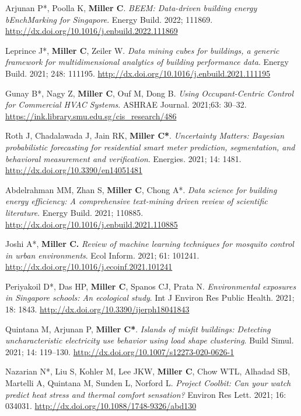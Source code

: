 \documentclass[10pt,a4paper]{article}
\begin{document}
\begin{small}
\begin{etaremune}
\item
Arjunan P*, Poolla K, \textbf{Miller C}. \emph{BEEM: Data-driven building energy bEnchMarking for Singapore}. Energy Build. 2022; 111869. \url{http://dx.doi.org/10.1016/j.enbuild.2022.111869}
\item
Leprince J*, \textbf{Miller C}, Zeiler W. \emph{Data mining cubes for buildings, a generic framework for multidimensional analytics of building performance data}. Energy Build. 2021; 248: 111195. \url{http://dx.doi.org/10.1016/j.enbuild.2021.111195}
\item
Gunay B*, Nagy Z, \textbf{Miller C}, Ouf M, Dong B. \emph{Using Occupant-Centric Control for Commercial HVAC Systems}. ASHRAE Journal. 2021;63: 30–32. \url{https://ink.library.smu.edu.sg/cis_research/486}
\item
Roth J, Chadalawada J, Jain RK, \textbf{Miller C*}. \emph{Uncertainty Matters: Bayesian probabilistic forecasting for residential smart meter prediction, segmentation, and behavioral measurement and verification}. Energies. 2021; 14: 1481. \url{http://dx.doi.org/10.3390/en14051481}
\item
Abdelrahman MM, Zhan S, \textbf{Miller C}, Chong A*. \emph{Data science for building energy efficiency: A comprehensive text-mining driven review of scientific literature}. Energy Build. 2021; 110885. \url{http://dx.doi.org/10.1016/j.enbuild.2021.110885}
\item
Joshi A*, \textbf{Miller C.} \emph{Review of machine learning techniques for mosquito control in urban environments}. Ecol Inform. 2021; 61: 101241. \url{http://dx.doi.org/10.1016/j.ecoinf.2021.101241}
\item
Periyakoil D*, Das HP, \textbf{Miller C}, Spanos CJ, Prata N. \emph{Environmental exposures in Singapore schools: An ecological study}. Int J Environ Res Public Health. 2021; 18: 1843. \url{http://dx.doi.org/10.3390/ijerph18041843}
\item
Quintana M, Arjunan P, \textbf{Miller C*}. \emph{Islands of misfit buildings: Detecting uncharacteristic electricity use behavior using load shape clustering}. Build Simul. 2021; 14: 119–130. \url{http://dx.doi.org/10.1007/s12273-020-0626-1}
\item
Nazarian N*, Liu S, Kohler M, Lee JKW, \textbf{Miller C}, Chow WTL, Alhadad SB, Martelli A, Quintana M, Sunden L, Norford L. \emph{Project Coolbit: Can your watch predict heat stress and thermal comfort sensation?} Environ Res Lett. 2021; 16: 034031. \url{http://dx.doi.org/10.1088/1748-9326/abd130}
\item

\end{etaremune}
\end{small}
\end{document}
